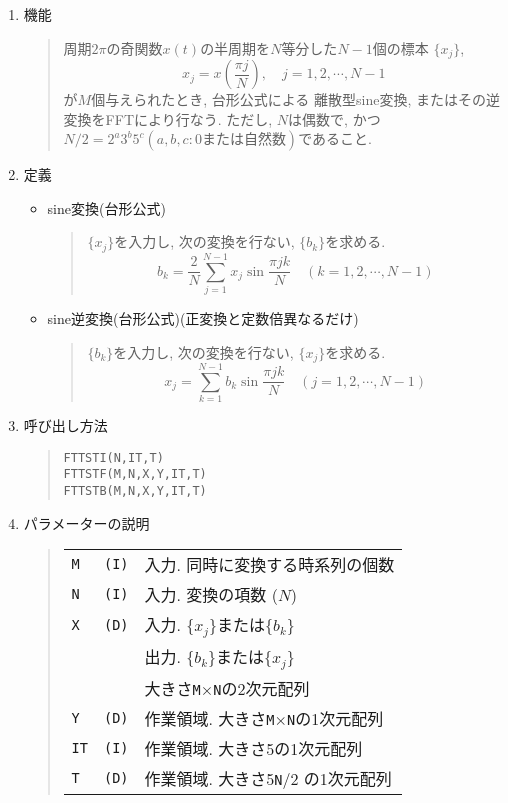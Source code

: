 \documentclass[a4j]{jarticle}
\newcommand{\ttM}{{\tt M}}
\newcommand{\ttN}{{\tt N}}
\begin{document}
\begin{enumerate}

  \item 機能 
  \begin{quote}
    周期$2\pi$の奇関数$x(t)$の半周期を$N$等分した$N-1$個の標本
    $\{x_j\}$,
     $$x_j=x(\frac{\pi j}{N}), \quad j=1,2,\cdots,N-1 $$
    が$M$個与えられたとき, 台形公式による
    離散型sine変換, またはその逆変換をFFTにより行なう. ただし, 
    $N$は偶数で, かつ$N/2=2^a3^b5^c(a,b,c: 0または自然数)$であること.
  \end{quote}

  \item 定義
    \begin{itemize}
     \item sine変換(台形公式)
      \begin{quote}
       $\{x_j\}$を入力し, 次の変換を行ない, $\{b_k\}$を求める.
       $$b_k= \frac2N\sum^{N-1}_{j=1}x_j\sin\frac{\pi jk}{N}
       \quad (k=1,2,\cdots,N-1)$$
      \end{quote}

     \item sine逆変換(台形公式)(正変換と定数倍異なるだけ)
      \begin{quote}
       $\{b_k\}$を入力し, 次の変換を行ない, $\{x_j\}$を求める.
       $$x_j=\sum^{N-1}_{k=1}b_k\sin\frac{\pi jk}{N}
       \quad (j=1,2,\cdots,N-1)$$
      \end{quote}
     \end{itemize}    

  \item 呼び出し方法 
  \begin{quote}
    {\tt FTTSTI(N,IT,T)}\\
    {\tt FTTSTF(M,N,X,Y,IT,T)}\\
    {\tt FTTSTB(M,N,X,Y,IT,T)}
  \end{quote}
  \item パラメーターの説明 
  \begin{quote}
    \begin{tabular}{llp{10cm}}
      {\tt M }&{\tt (I)}& 入力. 同時に変換する時系列の個数\\
      {\tt N }&{\tt (I)}& 入力. 変換の項数 ($N$)\\
      {\tt X }   & {\tt (D)} & 入力. $\{x_j\}$または$\{b_k\}$\\
                 &           & 出力. $\{b_k\}$または$\{x_j\}$\\
                 &           & 大きさ\ttM$\times$\ttN の2次元配列\\
      {\tt Y }   & {\tt (D)} & 作業領域. 大きさ\ttM$\times$\ttN の1次元配列\\
      {\tt IT}   & {\tt (I)} & 作業領域. 大きさ5の1次元配列\\
      {\tt T }   & {\tt (D)} & 作業領域. 大きさ5\ttN/2 の1次元配列
    \end{tabular}
  \end{quote}


\end{enumerate}
\end{document}
